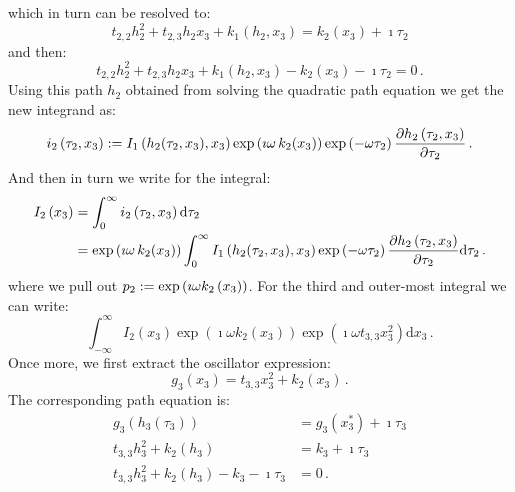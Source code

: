 \documentclass[a4paper,10pt]{article}
\begin{document}
which in turn can be resolved to:
\begin{equation}
  t_{2,2} h_2^2 + t_{2,3} h_2 x_3 + k_1(h_2, x_3) = k_2(x_3) + \imath \tau_2
\end{equation}
and then:
\begin{equation}
  t_{2,2} h_2^2 + t_{2,3} h_2 x_3 + k_1(h_2, x_3) - k_2(x_3) - \imath \tau_2 = 0 \,.
\end{equation}
Using this path $h_2$ obtained from solving the quadratic
path equation we get the new integrand as:
\begin{equation}
  i_2\left(\tau_2, x_3\right) := I_1\left(h_2(\tau_2, x_3), x_3\right)
                                 \exp\left(\imath \omega \,k_2\!\left(x_3\right) \right)
                                 \exp\left(- \omega \tau_2 \right)
                                 \frac{\partial h_2\left(\tau_2, x_3\right)}{\partial \tau_2} \,.
\end{equation}
And then in turn we write for the integral:
\begin{equation*}
\begin{split}
  I_2\left(x_3\right) & = \int_0^{\infty} i_2\left(\tau_2, x_3\right) \mathrm{d}\tau_2 \\
                      & = \exp\left(\imath \omega \,k_2\!\left(x_3\right) \right)
                          \int_0^{\infty} I_1\left(h_2(\tau_2, x_3), x_3\right)
                                          \exp\left(- \omega \tau_2 \right)
                                          \frac{\partial h_2\left(\tau_2, x_3\right)}{\partial \tau_2}
                          \mathrm{d}\tau_2 \,.
\end{split}
\end{equation*}
where we pull out $p_2 := \exp\left(\imath \omega k_2\left(x_3\right) \right)$.
For the third and outer-most integral we can write:
\begin{equation}
  \int_{-\infty}^{\infty} I_2\left(x_3\right)
                          \exp\left(\imath \omega k_2\left(x_3\right) \right)
                          \exp\left(\imath \omega t_{3,3} x_3^2\right)
  \mathrm{d}x_3 \,.
\end{equation}
Once more, we first extract the oscillator expression:
\begin{equation}
  g_3\left(x_3\right) = t_{3,3} x_3^2 + k_2(x_3)\,.
\end{equation}
The corresponding path equation is:
\begin{equation}
\begin{split}
  g_3\left(h_3\left(\tau_3\right)\right) & = g_3(x_3^{*}) + \imath \tau_3 \\
  t_{3,3} h_3^2 + k_2(h_3) & = k_3 + \imath \tau_3 \\
  t_{3,3} h_3^2 + k_2(h_3) - k_3 - \imath \tau_3 & = 0 \,.
\end{split}
\end{equation}
\end{document}
